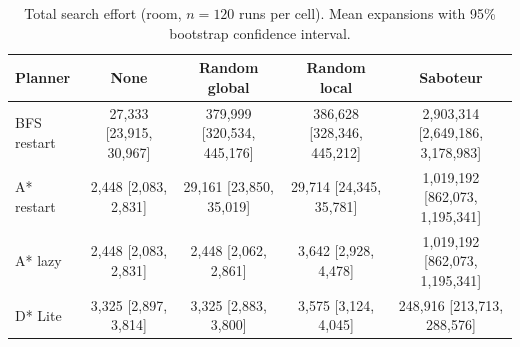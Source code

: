 \begin{table}[!t]
\centering
\footnotesize
\caption{Total search effort (room, $n=120$ runs per cell). Mean expansions with 95\% bootstrap confidence interval.}
\label{tab:total-room}
\begin{tabular}{lcccc}
\toprule
Planner & None & Random global & Random local & Saboteur \\
\midrule
BFS restart & 27,333 [23,915, 30,967] & 379,999 [320,534, 445,176] & 386,628 [328,346, 445,212] & 2,903,314 [2,649,186, 3,178,983] \\
A* restart & 2,448 [2,083, 2,831] & 29,161 [23,850, 35,019] & 29,714 [24,345, 35,781] & 1,019,192 [862,073, 1,195,341] \\
A* lazy & 2,448 [2,083, 2,831] & 2,448 [2,062, 2,861] & 3,642 [2,928, 4,478] & 1,019,192 [862,073, 1,195,341] \\
D* Lite & 3,325 [2,897, 3,814] & 3,325 [2,883, 3,800] & 3,575 [3,124, 4,045] & 248,916 [213,713, 288,576] \\
\bottomrule
\end{tabular}
\end{table}
